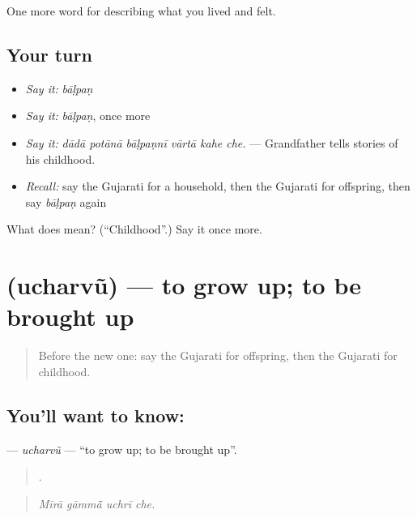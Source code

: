 \begin{grammarlens}[title={What you've built}]
One more word for describing what you lived and felt.
\end{grammarlens}

\subsection*{Your turn}
\begin{itemize}
\raggedright
  \item \emph{Say it:} \emph{bāḷpaṇ}
  \item \emph{Say it:} \emph{bāḷpaṇ}, once more
  \item \emph{Say it:} \emph{dādā potānā bāḷpaṇnī vārtā kahe che.} — Grandfather tells stories of his childhood.
  \item \emph{Recall:} say the Gujarati for a household, then the Gujarati for offspring, then say \emph{bāḷpaṇ} again
\end{itemize}

\begin{tcolorbox}[breakable,colback=teal!4,colframe=teal!35!black,title={Before you move on}]
What does  mean? (\textquotedblleft{}Childhood\textquotedblright{}.) Say it once more.
\end{tcolorbox}
\section[\texorpdfstring{\gu{ઉછરવું} (ucharvũ)}{ઉછરવું (ucharvũ)}]{ (ucharvũ) — to grow up; to be brought up}

\label{lesson:GU-C494-ucharvu}



\begin{quote}
Before the new one: say the Gujarati for offspring, then the Gujarati for childhood.
\end{quote}

\subsection*{You'll want to know: }
\textbf{} — \emph{ucharvũ} — \textquotedblleft{}to grow up; to be brought up\textquotedblright{}.

\begin{quote}
   .
\end{quote}

\begin{quote}
\emph{Mīrā gāmmā̃ uchrī che.}
\end{quote}

